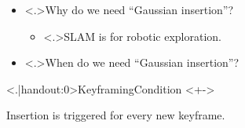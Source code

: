 \begin{frame}
	\begin{itemize}
		\item<+-> \alert<.>{Why} do we need ``Gaussian insertion''?
			\mode<presentation>{\vspace*{1.5ex}}
			\begin{itemize}
				\item<+-> \alert<.>{SLAM} is for robotic exploration.
			\end{itemize}
	\end{itemize}
	\begin{itemize}
		\item<+-> \alert<.>{When} do we need ``Gaussian insertion''?
	\end{itemize}
	\begin{block}{\alert<.|handout:0>{Keyframing}\hfill Condition }<+->
		\par Insertion is triggered for every new keyframe.
	\end{block}
\end{frame}

